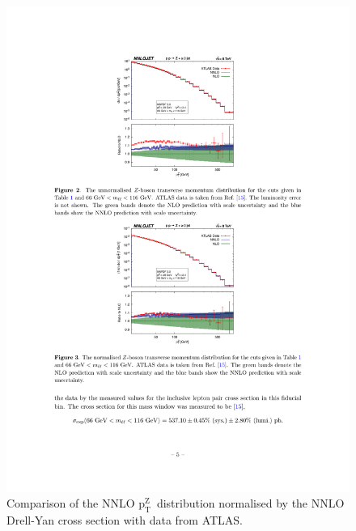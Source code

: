 \documentclass[a4paper,11pt,notoc]{article}
\newcommand{\ptZ}{\ensuremath{\mathrm{p_T^{Z}}}}
\begin{document}

\begin{figure}[t!]
\centering
\includegraphics[width=0.495\columnwidth]{ptZNNLO.pdf} 
\caption{Comparison of the NNLO \ptZ\ distribution normalised by the NNLO Drell-Yan cross section with data from ATLAS.}
\label{fig:ptNNLO}
\end{figure}   
\end{document}

